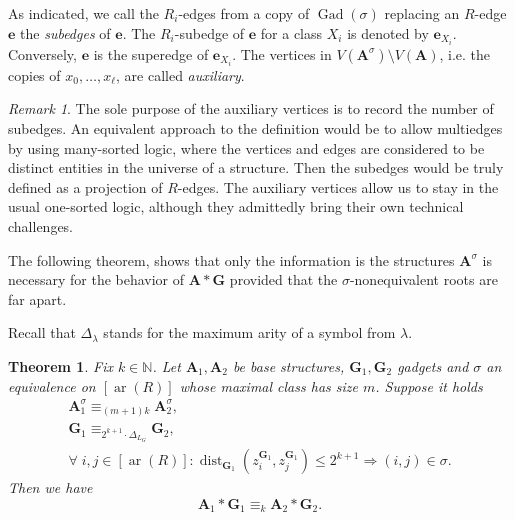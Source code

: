 \documentclass[11pt]{article}
\theoremstyle{plain}
\newtheorem{theorem}{Theorem}[section]
\theoremstyle{definition}
\theoremstyle{remark}
\newtheorem*{remark}{Remark}
\DeclareMathOperator\dist{dist}
\DeclareMathOperator\Gad{Gad}
\DeclareMathOperator\aritysym{ar}
\newcommand{\arity}[1]{{\aritysym({#1})}}
\newcommand{\N}{\mathbb{N}}
\newcommand{\str}[1]{\mathbf{#1}}
\newcommand{\maxarity}[1]{\Delta_{#1}}
\newcommand{\tpl}[1]{{\bm{#1}}}
\begin{document}

As indicated, we call the $R_i$-edges from a copy of $\Gad(\sigma)$ replacing an $R$-edge $\tpl{e}$ the \emph{subedges} of $\tpl{e}$.
The $R_i$-subedge of $\tpl{e}$ for a class $X_i$ is denoted by $\tpl{e}_{X_i}$.
Conversely, $\tpl{e}$ is the superedge of $\tpl{e}_{X_i}$.
The vertices in $V(\str{A}^\sigma) \setminus V(\str{A})$, i.e. the copies of $x_0, \dots, x_\ell$, are called \emph{auxiliary}.

\begin{remark}
    The sole purpose of the auxiliary vertices is to record the number of subedges.
    An equivalent approach to the definition would be to allow multiedges by using many-sorted logic, where the vertices and edges are considered to be distinct entities in the universe of a structure.
    Then the subedges would be truly defined as a projection of $R$-edges.
    The auxiliary vertices allow us to stay in the usual one-sorted logic, although they admittedly bring their own technical challenges.
\end{remark}

The following theorem, shows that only the information is the structures $\str{A}^\sigma$ is necessary for the behavior of $\str{A}*\str{G}$ provided that the $\sigma$-nonequivalent roots are far apart.

Recall that $\maxarity{\lambda}$ stands for the maximum arity of a symbol from $\lambda$.

\begin{theorem}\label{thm:elementary_equivalence_using_fragmentation}
    Fix $k \in \N$.
    Let $\str{A}_1, \str{A}_2$ be base structures, $\str{G}_1, \str{G}_2$ gadgets and $\sigma$ an equivalence on $[\arity{R}]$ whose maximal class has size $m$.
    Suppose it holds
    \begin{equation*}
        \begin{gathered} \str{A}^\sigma_1 \equiv_{(m+1)k} \str{A}^\sigma_2
            , \\
            \str{G}_1 \equiv_{2^{k+1}\cdot\maxarity{L_G}} \str{G}_2
            , \\
            \forall\; i,j \in [\arity{R}]: \dist_{\str{G}_1}(z_i^{\str{G}_1}, z_j^{\str{G}_1}) \leq 2^{k+1} \Rightarrow (i,j) \in \sigma
            .
        \end{gathered}
    \end{equation*}
    Then we have
    \[
        \str{A}_1 * \str{G}_1 \equiv_k \str{A}_2 * \str{G}_2
        .
    \]
\end{theorem}
\end{document}
